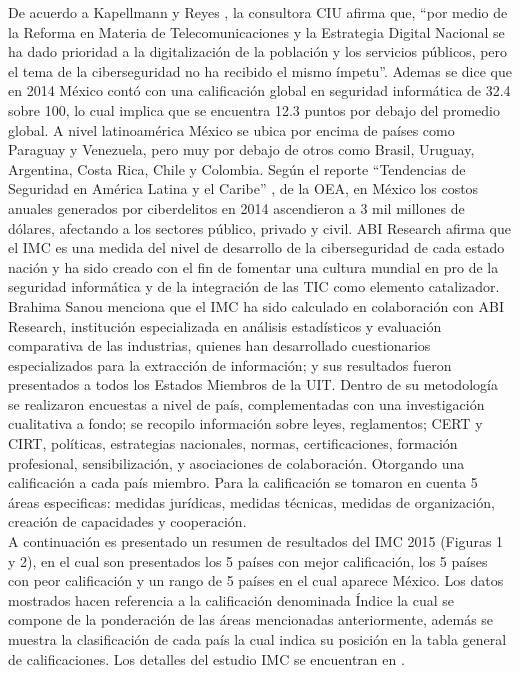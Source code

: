 \documentclass[runningheads,a4paper]{llncs}
\begin{document}
De acuerdo a Kapellmann y Reyes \cite{RCM_1}, la consultora \gls{CIU} afirma que, ``por medio de la Reforma en Materia de Telecomunicaciones \cite{RMT_1} y la Estrategia Digital Nacional \cite{EDN_1} se ha dado prioridad a la digitalización de la población y los servicios públicos, pero el tema de la ciberseguridad no ha recibido el mismo ímpetu''. Ademas se dice que en 2014 México contó con una calificación global en seguridad informática de 32.4 sobre 100, lo cual implica que se encuentra 12.3 puntos por debajo del promedio global. A nivel latinoamérica México se ubica por encima de países como Paraguay y Venezuela, pero muy por debajo de otros como Brasil, Uruguay, Argentina, Costa Rica, Chile y Colombia. Según el reporte ``Tendencias de Seguridad en América Latina y el Caribe'' \cite{TSCALC_1}, de la \gls{OEA}, en México los costos anuales generados por ciberdelitos en 2014 ascendieron a 3 mil millones de dólares, afectando a los sectores público, privado y civil. ABI Research \cite{GCSI_1} afirma que el \gls{IMC} es una medida del nivel de desarrollo de la ciberseguridad de cada estado nación y ha sido creado con el fin de fomentar una cultura mundial en pro de la seguridad informática y de la integración de las \gls{TIC} como elemento catalizador. Brahima Sanou \cite{GCSI_1} menciona que el \gls{IMC} ha sido calculado en colaboración con ABI Research, institución especializada en análisis estadísticos y evaluación comparativa de las industrias, quienes han desarrollado cuestionarios especializados para la extracción de información; y sus resultados fueron presentados a todos los Estados Miembros de la \gls{UIT}. Dentro de su metodología se realizaron encuestas a nivel de país, complementadas con una investigación cualitativa a fondo; se recopilo información sobre leyes, reglamentos; \gls{CERT} y \gls{CIRT}, políticas, estrategias nacionales, normas, certificaciones, formación profesional, sensibilización, y asociaciones de colaboración. Otorgando una calificación a cada país miembro. Para la calificación se tomaron en cuenta 5 áreas especificas: medidas jurídicas, medidas técnicas, medidas de organización, creación de capacidades y cooperación. \\

A continuación es presentado un resumen de resultados del \gls{IMC} 2015 (Figuras 1 y 2), en el cual son presentados los 5 países con mejor calificación, los 5 países con peor calificación y un rango de 5 países en el cual aparece México. Los datos mostrados hacen referencia a la calificación denominada Índice la cual se compone de la ponderación de las áreas mencionadas anteriormente, además se muestra la clasificación de cada país la cual indica su posición en la tabla general de calificaciones. Los detalles del estudio \gls{IMC} se encuentran en \cite{GCSI_1}.\\
\end{document}
